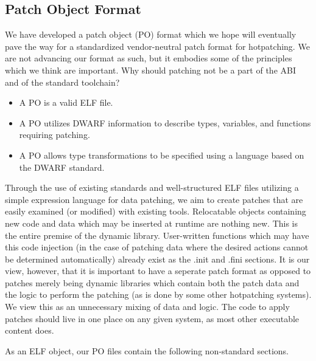 \documentclass[11pt]{article}
\begin{document}
\subsection{Patch Object Format}
\label{sec-3.6}

   We have developed a patch object (PO) format which we hope will
   eventually pave the way for a standardized vendor-neutral patch
   format for hotpatching. We are not advancing our format as such,
   but it embodies some of the principles which we think are
   important. Why should patching not be a part of the ABI and of the
   standard toolchain?
\begin{itemize}
\item A PO is a valid ELF file.
\item A PO utilizes DWARF information to describe types, variables, and
     functions requiring patching.
\item A PO allows type transformations to be specified using a language
     based on the DWARF standard.
\end{itemize}
   Through the use of existing standards and well-structured ELF files
   utilizing a simple expression language for data patching, we aim to
   create patches that are easily examined (or modified) with existing
   tools. Relocatable objects containing new code and data which may
   be inserted at runtime are nothing new. This is the entire premise
   of the dynamic library. User-written functions which may have this
   code injection (in the case of patching data where the desired
   actions cannot be determined automatically) already exist as the
   .init and .fini sections. It is our view, however, that it is
   important to have a seperate patch format as opposed to patches
   merely being dynamic libraries which contain both the patch data
   and the logic to perform the patching (as is done by some other
   hotpatching systems). We view this as an unnecessary mixing of data
   and logic. The code to apply patches should live in one place on
   any given system, as most other executable content does.

   As an ELF object, our PO files contain the following non-standard
   sections.
\end{document}
